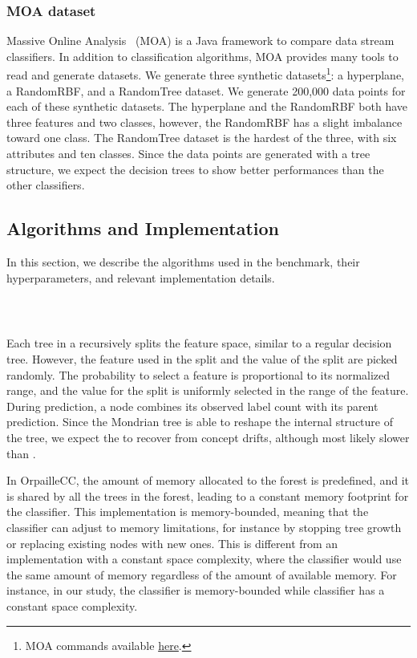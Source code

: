 \subsubsection{MOA dataset}
Massive Online Analysis~\cite{moa} (MOA) is a Java framework to compare
data stream classifiers. In addition to classification algorithms, MOA provides many
tools to read and generate datasets.
We generate three synthetic datasets\footnote{MOA commands available \href{https://github.com/azazel7/paper-benchmark/blob/e0c9a94d0d17490f7ab14293dec20b8322a6447c/Makefile\#L90}{here}.}:
a hyperplane, a RandomRBF, and a RandomTree
dataset. We generate 200,000 data points
 for each of these synthetic datasets.
The hyperplane and the RandomRBF both have three features and two classes, however, the RandomRBF has a slight imbalance toward one class.
The RandomTree dataset is the hardest of the three, with six attributes and
ten classes. Since the data points are generated with a tree structure, we
expect the decision trees to show better performances than the other
classifiers.

\subsection{Algorithms and Implementation}
In this section, we describe the algorithms used in the benchmark, their
hyperparameters, and relevant implementation details. 

\subsubsection{\mondrianforest~\cite{mondrian2014}}
Each tree in a \mondrianforest recursively splits
the feature space, similar to a regular decision tree.
However, the feature used in the split and the
value of the split are picked randomly. The
probability to select a feature is proportional to
its normalized range, and the value for the split is
uniformly selected in the range of the feature.
During prediction, a node combines its observed
label count with its parent prediction. Since the Mondrian tree is able to
reshape the internal structure of the tree, we expect the \mondrianforest
to recover from  concept drifts, although most likely slower than \mcnn.

In OrpailleCC, the amount of memory allocated to the forest is predefined,
and it is shared by all the trees in the forest, leading to a constant
memory footprint for the classifier. This implementation is memory-bounded,
meaning that the classifier can adjust to memory limitations, for instance
by stopping tree growth or replacing existing nodes with new ones. This is
different from an implementation with a constant space complexity, where
the classifier would use the same amount of memory regardless of the
amount of available memory. For instance, in our study, the \mondrianforest
classifier is memory-bounded while \naivebayes classifier has a constant
space complexity.

